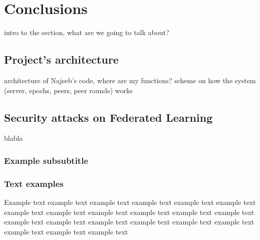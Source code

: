 \section{Conclusions}
intro to the section, what are we going to talk about?
\subsection{Project's architecture}
architecture of Najeeb's code, where are my functions?
scheme on how the system (server, epochs, peers, peer rounds) works

\subsection{Security attacks on Federated Learning}
blabla

\subsubsection{Example subsubtitle}


\subsubsection{Text examples}
Example text example text example text example text example text example text example text
example text example text example text example text example text example text example text
example text example text example text example text example text example text example text


\pagebreak